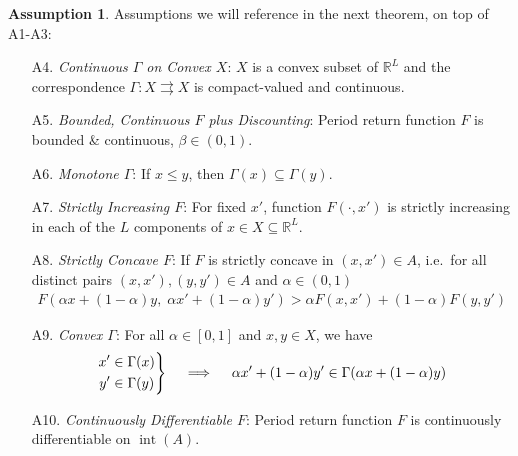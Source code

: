 \documentclass[12pt]{article}
\numberwithin{equation}{section} %
\theoremstyle{plain}
\newtheorem{prop}[thm]{Proposition}
\theoremstyle{definition}
\newtheorem{assump}[thm]{Assumption}
\theoremstyle{remark}
\newcommand{\R}{\mathbb{R}}
\newenvironment{rcases}
  {\left.\begin{aligned}}
  {\end{aligned}\right\rbrace}
\newcommand{\interior}{\operatorname{int}}
\begin{document}

\begin{assump}
Assumptions we will reference in the next theorem, on top of A1-A3:
\begin{enumerate}
  \item[A4.]
    \emph{Continuous $\Gamma$ on Convex $X$}:
    $X$ is a convex subset of $\R^L$ and the correspondence
    $\Gamma:X\rightrightarrows X$ is compact-valued and continuous.

  \item[A5.]
    \emph{Bounded, Continuous $F$ plus Discounting}:
    Period return function $F$ is bounded \& continuous,
    $\beta\in (0,1)$.

  \item[A6.]
    \emph{Monotone $\Gamma$}:
    If $x \leq y$, then $\Gamma(x) \subseteq \Gamma(y)$.

  \item[A7.]
    \emph{Strictly Increasing $F$}:
    For fixed $x'$, function $F(\cdot,x')$ is strictly increasing in
    each of the $L$ components of $x\in X\subseteq \R^L$.

  \item[A8.]
    \emph{Strictly Concave $F$}:
    If $F$ is strictly concave in $(x,x')\in A$, i.e.\ for all distinct
    pairs $(x,x'), (y,y') \in A$ and $\alpha \in (0,1)$
    \begin{align*}
      F\left(\alpha x + (1-\alpha)y, \; \alpha x' + (1-\alpha)y'\right)
      >
      \alpha F(x,x') + (1-\alpha)F(y,y')
    \end{align*}

  \item[A9.]
    \emph{Convex $\Gamma$}:
    For all $\alpha\in[0,1]$ and $x,y\in X$, we have
    \begin{align*}
      \begin{rcases}
        x'&\in \Gamma(x) \\
        y'&\in \Gamma(y)
      \end{rcases}
      \quad\implies\quad
      \alpha x' + (1-\alpha) y'
      \in \Gamma(\alpha x + (1-\alpha) y)
    \end{align*}

  \item[A10.]
    \emph{Continuously Differentiable $F$}:
    Period return function $F$ is continuously differentiable on
    $\interior(A)$.
\end{enumerate}
\end{assump}
\end{document}
